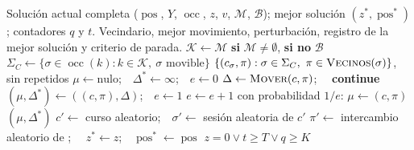 \documentclass{article}
\begin{document}
\begin{algorithm}[H]
\caption{Operadores comunes de ILS e ITS}
\label{alg:operadores}
\begin{algorithmic}[1]
\Require Solución actual completa ($\operatorname{pos}$, $Y$, $\operatorname{occ}$, $z$, $v$, $\mathcal{M}$, $\mathcal{B}$);
         mejor solución $(z^*, \operatorname{pos}^*)$; contadores $q$ y $t$.
\Ensure Vecindario, mejor movimiento, perturbación, registro de la mejor solución y criterio de parada.
 
    \State $\mathcal{K} \gets \mathcal{M}$ \textbf{si} $\mathcal{M} \neq \emptyset$, \textbf{si no} $\mathcal{B}$ 
    \State $\Sigma_C \gets \{\sigma \in \operatorname{occ}(k) : k \in \mathcal{K},\ \sigma \text{ movible}\}$
    \State \Return $\{(c_\sigma, \pi) : \sigma \in \Sigma_C,\ \pi \in \Call{Vecinos}{\sigma}\}$, sin repetidos 
\EndFunction
\Statex
{} 
    \State $\mu \gets \text{nulo}$;\ \ $\Delta^* \gets \infty$;\ \ $e \gets 0$
        \State $\Delta \gets \Call{Mover}{c, \pi}$;\ \  
            \State \textbf{continue}
        \EndIf
        \If{$\Delta < \Delta^*$}
            \State $(\mu, \Delta^*) \gets ((c, \pi), \Delta)$;\ \ $e \gets 1$
        \ElsIf{$\Delta = \Delta^*$}
            \State $e \gets e + 1$
            \State con probabilidad $1/e$: $\mu \gets (c, \pi)$ 
        \EndIf
    \EndFor
    \State \Return $(\mu, \Delta^*)$
\EndFunction
\Statex
{} 
        \State $c' \gets$ curso aleatorio;\ \ $\sigma' \gets$ sesión aleatoria de $c'$
        \State $\pi' \gets$ intercambio aleatorio de ;\ \ 
    \EndFor
\EndProcedure
\Statex
{} 
        \State $z^* \gets z$;\ \ $\operatorname{pos}^* \gets \operatorname{pos}$ 
    \EndIf
\EndProcedure
\Statex
{} 
    \State \Return $z = 0 \vee t \ge T \vee q \ge K$
\EndFunction
\end{algorithmic}
\end{algorithm}
\end{document}

